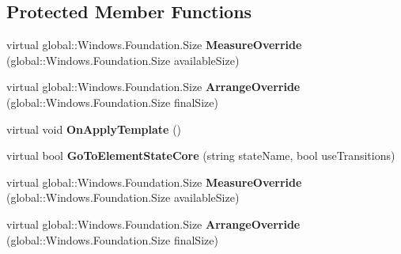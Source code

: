 \subsection*{Protected Member Functions}
\begin{DoxyCompactItemize}
\item 
\mbox{\label{class_windows_1_1_u_i_1_1_xaml_1_1_framework_element_af7bed5025864082e11a8690534124dd6}} 
virtual global\+::\+Windows.\+Foundation.\+Size {\bfseries Measure\+Override} (global\+::\+Windows.\+Foundation.\+Size available\+Size)
\item 
\mbox{\label{class_windows_1_1_u_i_1_1_xaml_1_1_framework_element_ae01b5ef9f4d89b138b02e23be40b1a6d}} 
virtual global\+::\+Windows.\+Foundation.\+Size {\bfseries Arrange\+Override} (global\+::\+Windows.\+Foundation.\+Size final\+Size)
\item 
\mbox{\label{class_windows_1_1_u_i_1_1_xaml_1_1_framework_element_a176a704e93c067d7a68890b4560a974a}} 
virtual void {\bfseries On\+Apply\+Template} ()
\item 
\mbox{\label{class_windows_1_1_u_i_1_1_xaml_1_1_framework_element_ab28bfbcd2ce35b9f1d361c4b523e169b}} 
virtual bool {\bfseries Go\+To\+Element\+State\+Core} (string state\+Name, bool use\+Transitions)
\item 
\mbox{\label{class_windows_1_1_u_i_1_1_xaml_1_1_framework_element_af7bed5025864082e11a8690534124dd6}} 
virtual global\+::\+Windows.\+Foundation.\+Size {\bfseries Measure\+Override} (global\+::\+Windows.\+Foundation.\+Size available\+Size)
\item 
\mbox{\label{class_windows_1_1_u_i_1_1_xaml_1_1_framework_element_ae01b5ef9f4d89b138b02e23be40b1a6d}} 
virtual global\+::\+Windows.\+Foundation.\+Size {\bfseries Arrange\+Override} (global\+::\+Windows.\+Foundation.\+Size final\+Size)
\item 
\mbox{\label{class_windows_1_1_u_i_1_1_xaml_1_1_framework_element_a176a704e93c067d7a68890b4560a974a}} 

\end{DoxyCompactItemize}
